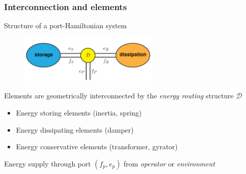 \documentclass[student]{ITRslides}
\begin{document}
\begin{frame}
	\frametitle{Interconnection and elements}
Structure of a port-Hamiltonian system
				\begin{figure}
			\centering
			\includegraphics[width=0.6\textwidth]{diracstructure.png}
			\end{figure}
			Elements are geometrically interconnected by the \emph{energy routing} structure $\mathcal{D}$
			\begin{itemize}
				\item Energy storing elements (inertia, spring)
				\item Energy dissipating elements (damper)
				\item Energy conservative elements (transformer, gyrator)
			\end{itemize}
			Energy supply through port $(f_p,e_p)$ from \emph{operator} or \emph{environment}
\end{frame}

%
%
\end{document}
